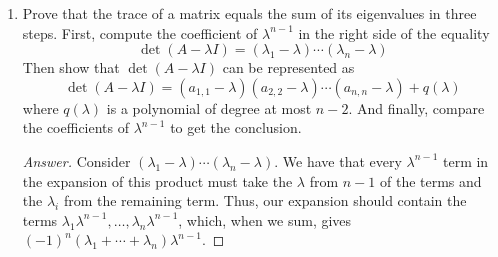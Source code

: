 \documentclass[../psets.tex]{subfiles}
\begin{document}
\begin{enumerate}[label={\textbf{1.\arabic*.}}]
\begin{proof}[Answer]
        We know that the roots of the characteristic polynomial $\det(A-\lambda I)$ of $A$ are exactly the eigenvalues $\lambda_1,\dots,\lambda_n$ of $A$. In other words, $\det(A-\lambda I)$ must go to zero exactly when $\lambda=\lambda_i$ for some $i$. Thus, $\det(A-\lambda I)$ must be of the form
        \begin{equation*}
            c(\lambda_1-\lambda)\cdots(\lambda_n-\lambda)
        \end{equation*}
        for some $c\in\F$. But since $\lambda$ only occurs in $A-\lambda I$ with the coefficient $-1$, and the $\lambda^n$ term is solely generated by the term in the permutation sum that is the product of the diagonal entries, the $\lambda^n$ term must have coefficient $(-1)^n$. Additionally, the polynomial above will have $\lambda^n$ have coefficient $(-1)^n$. Thus, we must have $c=1$, and we have proven the hint. Therefore,
        \begin{align*}
            \det A &= \det(A-0I)\\
            &= (\lambda_1-0)\cdots(\lambda_n-0)\\
            &= \lambda_1\cdots\lambda_n
        \end{align*}
        as desired.
    \end{proof}
    \item Prove that the trace of a matrix equals the sum of its eigenvalues in three steps. First, compute the coefficient of $\lambda^{n-1}$ in the right side of the equality
    \begin{equation*}
        \det(A-\lambda I) = (\lambda_1-\lambda)\cdots(\lambda_n-\lambda)
    \end{equation*}
    Then show that $\det(A-\lambda I)$ can be represented as
    \begin{equation*}
        \det(A-\lambda I) = (a_{1,1}-\lambda)(a_{2,2}-\lambda)\cdots(a_{n,n}-\lambda)+q(\lambda)
    \end{equation*}
    where $q(\lambda)$ is a polynomial of degree at most $n-2$. And finally, compare the coefficients of $\lambda^{n-1}$ to get the conclusion.
    \begin{proof}[Answer]
        Consider $(\lambda_1-\lambda)\cdots(\lambda_n-\lambda)$. We have that every $\lambda^{n-1}$ term in the expansion of this product must take the $\lambda$ from $n-1$ of the terms and the $\lambda_i$ from the remaining term. Thus, our expansion should contain the terms $\lambda_1\lambda^{n-1},\dots,\lambda_n\lambda^{n-1}$, which, when we sum, gives $(-1)^n(\lambda_1+\cdots+\lambda_n)\lambda^{n-1}$.\par

\end{proof}
\end{enumerate}
\end{document}
